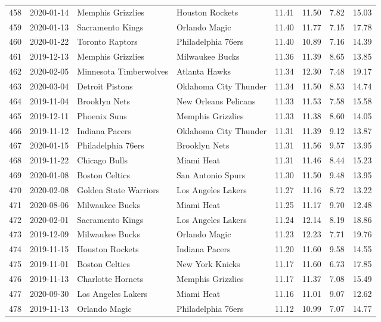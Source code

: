 \documentclass[
  11pt,
]{article}
\theoremstyle{nonumberplain}
\begin{document}
\begin{longtable}{rl|llr|rrr}
458 & 2020-01-14 & Memphis Grizzlies & Houston Rockets & 11.41 & 11.50 & 7.82 & 15.03\\
459 & 2020-01-13 & Sacramento Kings & Orlando Magic & 11.40 & 11.77 & 7.15 & 17.78\\
460 & 2020-01-22 & Toronto Raptors & Philadelphia 76ers & 11.40 & 10.89 & 7.16 & 14.39\\
461 & 2019-12-13 & Memphis Grizzlies & Milwaukee Bucks & 11.36 & 11.39 & 8.65 & 13.85\\
462 & 2020-02-05 & Minnesota Timberwolves & Atlanta Hawks & 11.34 & 12.30 & 7.48 & 19.17\\
463 & 2020-03-04 & Detroit Pistons & Oklahoma City Thunder & 11.34 & 11.50 & 8.53 & 14.74\\
464 & 2019-11-04 & Brooklyn Nets & New Orleans Pelicans & 11.33 & 11.53 & 7.58 & 15.58\\
465 & 2019-12-11 & Phoenix Suns & Memphis Grizzlies & 11.33 & 11.38 & 8.60 & 14.05\\
466 & 2019-11-12 & Indiana Pacers & Oklahoma City Thunder & 11.31 & 11.39 & 9.12 & 13.87\\
467 & 2020-01-15 & Philadelphia 76ers & Brooklyn Nets & 11.31 & 11.56 & 9.57 & 13.95\\
468 & 2019-11-22 & Chicago Bulls & Miami Heat & 11.31 & 11.46 & 8.44 & 15.23\\
469 & 2020-01-08 & Boston Celtics & San Antonio Spurs & 11.30 & 11.50 & 9.48 & 13.95\\
470 & 2020-02-08 & Golden State Warriors & Los Angeles Lakers & 11.27 & 11.16 & 8.72 & 13.22\\
471 & 2020-08-06 & Milwaukee Bucks & Miami Heat & 11.25 & 11.17 & 9.70 & 12.48\\
472 & 2020-02-01 & Sacramento Kings & Los Angeles Lakers & 11.24 & 12.14 & 8.19 & 18.86\\
473 & 2019-12-09 & Milwaukee Bucks & Orlando Magic & 11.23 & 12.23 & 7.71 & 19.76\\
474 & 2019-11-15 & Houston Rockets & Indiana Pacers & 11.20 & 11.60 & 9.58 & 14.55\\
475 & 2019-11-01 & Boston Celtics & New York Knicks & 11.17 & 11.60 & 6.73 & 17.85\\
476 & 2019-11-13 & Charlotte Hornets & Memphis Grizzlies & 11.17 & 11.37 & 7.08 & 15.49\\
477 & 2020-09-30 & Los Angeles Lakers & Miami Heat & 11.16 & 11.01 & 9.07 & 12.62\\
478 & 2019-11-13 & Orlando Magic & Philadelphia 76ers & 11.12 & 10.99 & 7.07 & 14.77\\

\end{longtable}
\end{document}

